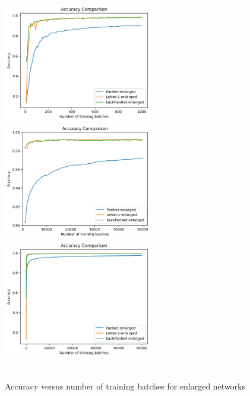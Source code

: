 \begin{figure}[th]
\centering
\includegraphics[width=65mm]{Figures/enlarged_net_accu_plot_combined_1}
\includegraphics[width=65mm]{Figures/enlarged_net_accu_plot_combined_2}
\includegraphics[width=65mm]{Figures/enlarged_net_accu_plot_combined}
\decoRule
\caption{\\Accuracy versus number of training batches for enlarged networks}
\label{fig:enlarged_net_accu_plot_combined}
\end{figure}




